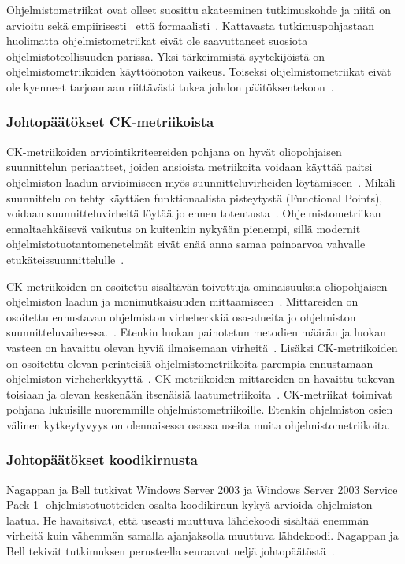 \documentclass[finnish]{tktltiki2}
\theoremstyle{definition}
\theoremstyle{remark}
\begin{document}
Ohjelmistometriikat ovat olleet suosittu akateeminen tutkimuskohde ja niitä on arvioitu sekä empiirisesti~\cite{SK03, BBM96} että formaalisti~\cite{W88}. Kattavasta tutkimuspohjastaan huolimatta ohjelmistometriikat eivät ole saavuttaneet suosiota ohjelmistoteollisuuden parissa. Yksi tärkeimmistä syytekijöistä on ohjelmistometriikoiden käyttöönoton vaikeus. Toiseksi ohjelmistometriikat eivät ole kyenneet tarjoamaan riittävästi tukea johdon päätöksentekoon~\cite{FM00}.

\subsubsection{Johtopäätökset CK-metriikoista}

CK-metriikoiden arviointikriteereiden pohjana on hyvät oliopohjaisen suunnittelun periaatteet, joiden ansioista metriikoita voidaan käyttää paitsi ohjelmiston laadun arvioimiseen myös suunnitteluvirheiden löytämiseen~\cite{CK94}. Mikäli suunnittelu on tehty käyttäen funktionaalista pisteytystä (Functional Points), voidaan suunnitteluvirheitä löytää jo ennen toteutusta~\cite{A79, CK94}. Ohjelmistometriikan ennaltaehkäisevä vaikutus on kuitenkin nykyään pienempi, sillä modernit ohjelmistotuotantomenetelmät eivät enää anna samaa painoarvoa vahvalle etukäteissuunnittelulle~\cite{BBB00}.

CK-metriikoiden on osoitettu sisältävän toivottuja ominaisuuksia oliopohjaisen ohjelmiston laadun ja monimutkaisuuden mittaamiseen~\cite{GFS05}. Mittareiden on osoitettu ennustavan ohjelmiston virheherkkiä osa-alueita jo ohjelmiston suunnitteluvaiheessa.~\cite{CK94, BBM96, SK03}. Etenkin luokan painotetun metodien määrän ja luokan vasteen on havaittu olevan hyviä ilmaisemaan virheitä~\cite{TKC99, OEGQ07}. Lisäksi CK-metriikoiden on osoitettu olevan perinteisiä ohjelmistometriikoita parempia ennustamaan ohjelmiston virheherkkyyttä~\cite{BBM96}. CK-metriikoiden mittareiden on havaittu tukevan toisiaan ja olevan keskenään itsenäisiä laatumetriikoita~\cite{BBM96}. CK-metriikat toimivat pohjana lukuisille nuoremmille ohjelmistometriikoille. Etenkin ohjelmiston osien välinen kytkeytyvyys on olennaisessa osassa useita muita ohjelmistometriikoita.

\subsubsection{Johtopäätökset koodikirnusta}

Nagappan ja Bell tutkivat Windows Server 2003 ja Windows Server 2003 Service Pack 1 -ohjelmistotuotteiden osalta koodikirnun kykyä arvioida ohjelmiston laatua. He havaitsivat, että useasti muuttuva lähdekoodi sisältää enemmän virheitä kuin vähemmän samalla ajanjaksolla muuttuva lähdekoodi. Nagappan ja Bell tekivät tutkimuksen perusteella seuraavat neljä johtopäätöstä~\cite{NB05}.
\end{document}
